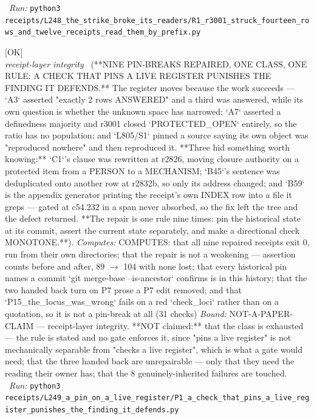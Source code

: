 \begin{description}
\ \emph{Run:} \texttt{python3 receipts/L248\_the\_strike\_broke\_its\_readers/R1\_r3001\_struck\_fourteen\_rows\_and\_twelve\_receipts\_read\_them\_by\_prefix.py}
\item[\label{rcpt:P1_a_check_that_pins_a_live_register_punishes_the_finding_it_defends}\texttt{P1\_a\_check\_that\_pins\_a\_live\_register\_punishes\_the\_finding\_it\_defends}]\hfill\textsf{[OK]}\\
\textit{receipt-layer integrity} \ (**NINE PIN-BREAKS REPAIRED, ONE CLASS, ONE RULE: A CHECK THAT PINS A LIVE REGISTER PUNISHES THE FINDING IT DEFENDS.** The register moves because the work succeeds --- `A3` asserted "exactly 2 rows ANSWERED" and a third was answered, while its own question is whether the unknown space has narrowed; `A7` asserted a definedness majority and r3001 closed `PROTECTED\_OPEN` entirely, so the ratio has no population; and `L805/S1` pinned a source saying its own object was "reproduced nowhere" and then reproduced it. **Three hid something worth knowing:** `C1`'s clause was rewritten at r2826, moving closure authority on a protected item from a PERSON to a MECHANISM; `B45`'s sentence was deduplicated onto another row at r2832b, so only its address changed; and `B59` is the appendix generator printing the receipt's own INDEX row into a file it greps --- gated at c54.232 in a span never absorbed, so the fix left the tree and the defect returned. **The repair is one rule nine times: pin the historical state at its commit, assert the current state separately, and make a directional check MONOTONE.**). 
\emph{Computes:} COMPUTES: that all nine repaired receipts exit 0, run from their own directories; that the repair is not a weakening --- assertion counts before and after, 89 \ensuremath{\to} 104 with none lost; that every historical pin names a commit `git merge-base --is-ancestor` confirms is in this history; that the two handed back turn on P7 prose a P7 edit removed; and that `P15\_the\_locus\_was\_wrong` fails on a red `check\_loci` rather than on a quotation, so it is not a pin-break at all (31 checks)
 \emph{Bound:} NOT-A-PAPER-CLAIM --- receipt-layer integrity. **NOT claimed:** that the class is exhausted --- the rule is stated and no gate enforces it, since "pins a live register" is not mechanically separable from "checks a live register", which is what a gate would need; that the three handed back are unrepairable --- only that they need the reading their owner has; that the 8 genuinely-inherited failures are touched.
\ \emph{Run:} \texttt{python3 receipts/L249\_a\_pin\_on\_a\_live\_register/P1\_a\_check\_that\_pins\_a\_live\_register\_punishes\_the\_finding\_it\_defends.py}

\end{description}
